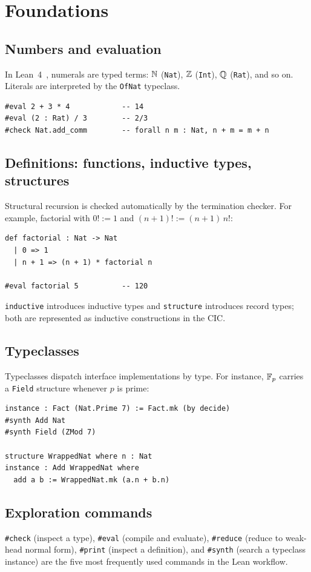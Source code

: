 \section{Foundations}\label{sec:foundations}

\subsection{Numbers and evaluation}
In Lean~4~\cite{deMouraUllrich2021}, numerals are typed terms: $\mathbb{N}$
(\texttt{Nat}), $\mathbb{Z}$ (\texttt{Int}), $\mathbb{Q}$ (\texttt{Rat}), and so on.
Literals are interpreted by the \texttt{OfNat} typeclass.

\begin{lstlisting}
#eval 2 + 3 * 4            -- 14
#eval (2 : Rat) / 3        -- 2/3
#check Nat.add_comm        -- forall n m : Nat, n + m = m + n
\end{lstlisting}

\subsection{Definitions: functions, inductive types, structures}
Structural recursion is checked automatically by the termination checker.
For example, factorial with $0! := 1$ and $(n+1)! := (n+1)\,n!$:

\begin{lstlisting}
def factorial : Nat -> Nat
  | 0 => 1
  | n + 1 => (n + 1) * factorial n

#eval factorial 5          -- 120
\end{lstlisting}

\texttt{inductive} introduces inductive types and \texttt{structure}
introduces record types; both are represented as inductive constructions in
the CIC.

\subsection{Typeclasses}
Typeclasses dispatch interface implementations by type. For instance,
$\mathbb{F}_{p}$ carries a \texttt{Field} structure whenever $p$ is prime:

\begin{lstlisting}
instance : Fact (Nat.Prime 7) := Fact.mk (by decide)
#synth Add Nat
#synth Field (ZMod 7)

structure WrappedNat where n : Nat
instance : Add WrappedNat where
  add a b := WrappedNat.mk (a.n + b.n)
\end{lstlisting}

\subsection{Exploration commands}
\texttt{\#check} (inspect a type), \texttt{\#eval} (compile and evaluate),
\texttt{\#reduce} (reduce to weak-head normal form), \texttt{\#print}
(inspect a definition), and \texttt{\#synth} (search a typeclass instance)
are the five most frequently used commands in the Lean workflow.
